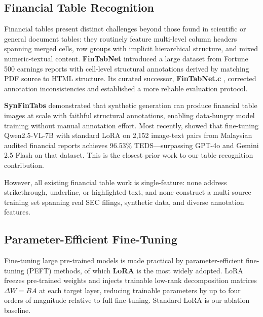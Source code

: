 \documentclass[10pt,twocolumn]{article}
\begin{document}
\subsection{Financial Table Recognition}
\label{sec:related:tables}

Financial tables present distinct challenges beyond those found in scientific or
general document tables: they routinely feature multi-level column headers
spanning merged cells, row groups with implicit hierarchical structure, and mixed
numeric-textual content. \textbf{FinTabNet} \cite{zheng2021fintabnet} introduced
a large dataset from Fortune 500 earnings reports with cell-level structural
annotations derived by matching PDF source to HTML structure. Its curated
successor, \textbf{FinTabNet.c} \cite{smock2023fintabnetc}, corrected annotation
inconsistencies and established a more reliable evaluation protocol.

\textbf{SynFinTabs} \cite{bradley2024synfintabs} demonstrated that synthetic
generation can produce financial table images at scale with faithful structural
annotations, enabling data-hungry model training without manual annotation effort.
Most recently, \citet{tan2025vlmtable} showed that fine-tuning Qwen2.5-VL-7B
with standard LoRA on 2{,}152 image-text pairs from Malaysian audited financial
reports achieves 96.53\% TEDS---surpassing GPT-4o and Gemini 2.5 Flash on that
dataset. This is the closest prior work to our table recognition contribution.

However, all existing financial table work is single-feature: none address
strikethrough, underline, or highlighted text, and none construct a multi-source
training set spanning real SEC filings, synthetic data, and diverse annotation
features.

\subsection{Parameter-Efficient Fine-Tuning}
\label{sec:related:peft}

Fine-tuning large pre-trained models is made practical by parameter-efficient
fine-tuning (PEFT) methods, of which \textbf{LoRA} \cite{hu2022lora} is the
most widely adopted. LoRA freezes pre-trained weights and injects trainable
low-rank decomposition matrices $\Delta W = BA$ at each target layer, reducing
trainable parameters by up to four orders of magnitude relative to full
fine-tuning. Standard LoRA is our ablation baseline.
\end{document}
